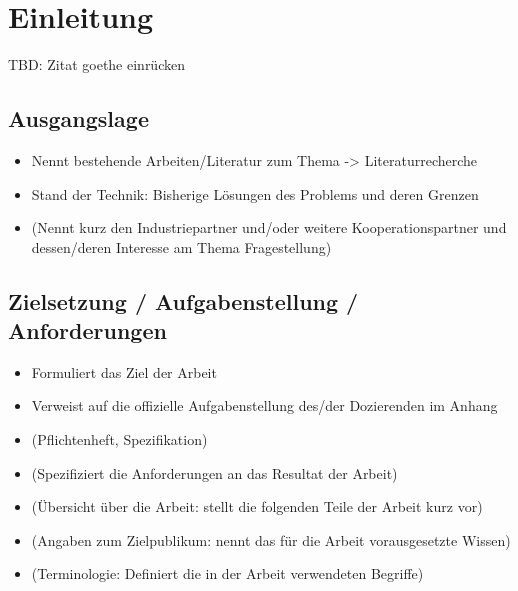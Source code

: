 %
%

\chapter{Einleitung}\label{chap.einleitung}
TBD: Zitat goethe einrücken


\section{Ausgangslage}\label{ausgangslage}

\begin{itemize}
\item Nennt bestehende Arbeiten/Literatur zum Thema -> Literaturrecherche
\item Stand der Technik: Bisherige Lösungen des Problems und deren Grenzen
\item (Nennt kurz den Industriepartner und/oder weitere Kooperationspartner und dessen/deren Interesse am Thema Fragestellung)
\end{itemize}



\section{Zielsetzung / Aufgabenstellung / Anforderungen}\label{zielsetzung}

\begin{itemize}
\item Formuliert das Ziel der Arbeit
\item Verweist auf die offizielle Aufgabenstellung des/der Dozierenden im Anhang
\item (Pflichtenheft, Spezifikation)
\item (Spezifiziert die Anforderungen an das Resultat der Arbeit)
\item (Übersicht über die Arbeit: stellt die folgenden Teile der Arbeit kurz vor)
\item (Angaben zum Zielpublikum: nennt das für die Arbeit vorausgesetzte Wissen)
\item (Terminologie: Definiert die in der Arbeit verwendeten Begriffe)
\end{itemize}
